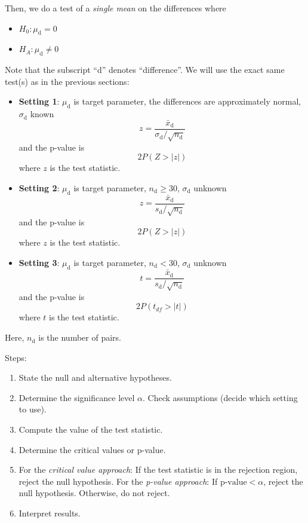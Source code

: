 \documentclass[
]{book}
\providecommand{\tightlist}{%
  \setlength{\itemsep}{0pt}\setlength{\parskip}{0pt}}
\begin{document}
Then, we do a test of a \emph{single mean} on the differences where

\begin{itemize}
\tightlist
\item
  \(H_0: \mu_{\text{d}} = 0\)
\item
  \(H_A: \mu_{\text{d}} \ne 0\)
\end{itemize}

Note that the subscript ``d'' denotes ``difference''. We will use the exact same test(s) as in the previous sections:

\begin{itemize}
\item
  \textbf{Setting 1}: \(\mu_{\text{d}}\) is target parameter, the differences are approximately normal, \(\sigma_{\text{d}}\) known \[z = \frac{\bar{x}_{\text{d}}}{\sigma_{\text{d}}/\sqrt{n_{\text{d}}}}\] and the p-value is \[2P(Z > |z|)\] where \(z\) is the test statistic.
\item
  \textbf{Setting 2}: \(\mu_{\text{d}}\) is target parameter, \(n_{\text{d}} \ge 30\), \(\sigma_{\text{d}}\) unknown \[z = \frac{\bar{x}_{\text{d}}}{s_{\text{d}}/\sqrt{n_{\text{d}}}}\] and the p-value is \[2P(Z > |z|)\] where \(z\) is the test statistic.
\item
  \textbf{Setting 3}: \(\mu_{\text{d}}\) is target parameter, \(n_{\text{d}} < 30\), \(\sigma_{\text{d}}\) unknown \[t = \frac{\bar{x}_{\text{d}}}{s_{\text{d}}/\sqrt{n_{\text{d}}}}\] and the p-value is \[2P(t_{df} > |t|)\] where \(t\) is the test statistic.
\end{itemize}

Here, \(n_{\text{d}}\) is the number of pairs.

Steps:

\begin{enumerate}
\def\labelenumi{\arabic{enumi}.}
\tightlist
\item
  State the null and alternative hypotheses.
\item
  Determine the significance level \(\alpha\). Check assumptions (decide which setting to use).
\item
  Compute the value of the test statistic.
\item
  Determine the critical values or p-value.
\item
  For the \emph{critical value approach}: If the test statistic is in the rejection region, reject the null hypothesis. For the \emph{p-value approach}: If \(\text{p-value} < \alpha\), reject the null hypothesis. Otherwise, do not reject.
\item
  Interpret results.
\end{enumerate}
\end{document}
